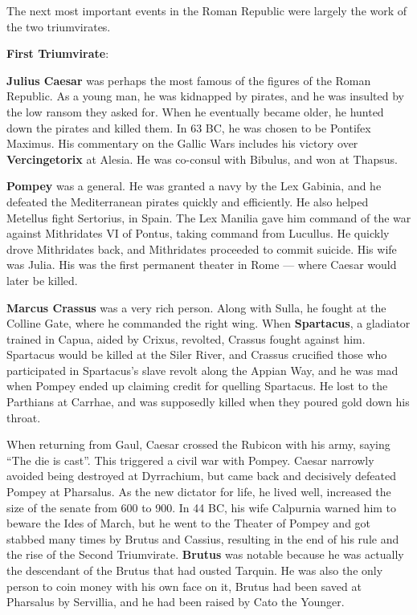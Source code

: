 The next most important events in the Roman Republic were largely the work of the two triumvirates.

\textbf{First Triumvirate}:

\textbf{Julius Caesar} was perhaps the most famous of the figures of the Roman Republic.
As a young man, he was kidnapped by pirates, and he was insulted by the low ransom they asked for.
When he eventually became older, he hunted down the pirates and killed them.
In 63 BC, he was chosen to be Pontifex Maximus.
His commentary on the Gallic Wars includes his victory over \textbf{Vercingetorix} at Alesia.
He was co-consul with Bibulus, and won at Thapsus.

\textbf{Pompey} was a general. He was granted a navy by the Lex Gabinia, and he defeated
the Mediterranean pirates quickly and efficiently.
He also helped Metellus fight Sertorius, in Spain.
The Lex Manilia gave him command of the war against Mithridates VI of Pontus, taking command from Lucullus.
He quickly drove Mithridates back, and Mithridates proceeded to commit suicide.
His wife was Julia.
His was the first permanent theater in Rome --- where Caesar would later be killed.

\textbf{Marcus Crassus} was a very rich person.
Along with Sulla, he fought at the Colline Gate, where he commanded the right wing.
When \textbf{Spartacus}, a gladiator trained in Capua, aided by Crixus, revolted, Crassus fought against him.
Spartacus would be killed at the Siler River, and
Crassus crucified those who participated in Spartacus's slave revolt along the Appian Way,
and he was mad when Pompey ended up claiming credit for quelling Spartacus.
He lost to the Parthians at Carrhae, and was supposedly killed when they poured gold down his throat.

When returning from Gaul, Caesar crossed the Rubicon with his army, saying ``The die is cast''.
This triggered a civil war with Pompey.
Caesar narrowly avoided being destroyed at Dyrrachium, but came back and decisively defeated Pompey at Pharsalus.
As the new dictator for life, he lived well, increased the size of the senate from 600 to 900.
In 44 BC, his wife Calpurnia warned him to beware the Ides of March,
but he went to the Theater of Pompey and got stabbed many times by Brutus and Cassius,
resulting in the end of his rule and the rise of the Second Triumvirate.
\textbf{Brutus} was notable because he was actually the descendant of the Brutus that had ousted Tarquin.
He was also the only person to coin money with his own face on it,
Brutus had been saved at Pharsalus by Servillia, and he had been raised by Cato the Younger.

